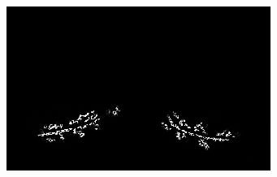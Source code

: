 {\begin{figure}[htbp]
\begin{subfigure}{.4\linewidth}
  \caption{}
	\label{fig:FissureDetection-c}
\end{subfigure}
\begin{subfigure}{.412\linewidth}%
  \includegraphics[width=\linewidth,trim={{.0\wd0} {.0\wd0} {.0\wd0} {.0\wd0}},clip]{Segmentation/Image/FissureDetection4.jpg}\label{fig:FissureDetection}
  \caption{}
	\label{fig:FissureDetection-d}
\end{subfigure}
\begin{subfigure}{.41\linewidth}%

\end{subfigure}
\end{figure}}

